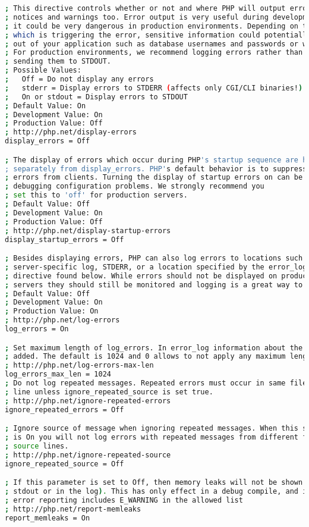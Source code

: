 \begin{lstlisting}[language=bash]
; This directive controls whether or not and where PHP will output errors,
; notices and warnings too. Error output is very useful during development, but
; it could be very dangerous in production environments. Depending on the code
; which is triggering the error, sensitive information could potentially leak
; out of your application such as database usernames and passwords or worse.
; For production environments, we recommend logging errors rather than
; sending them to STDOUT.
; Possible Values:
;   Off = Do not display any errors
;   stderr = Display errors to STDERR (affects only CGI/CLI binaries!)
;   On or stdout = Display errors to STDOUT
; Default Value: On
; Development Value: On
; Production Value: Off
; http://php.net/display-errors
display_errors = Off

; The display of errors which occur during PHP's startup sequence are handled
; separately from display_errors. PHP's default behavior is to suppress those
; errors from clients. Turning the display of startup errors on can be useful in
; debugging configuration problems. We strongly recommend you
; set this to 'off' for production servers.
; Default Value: Off
; Development Value: On
; Production Value: Off
; http://php.net/display-startup-errors
display_startup_errors = Off

; Besides displaying errors, PHP can also log errors to locations such as a
; server-specific log, STDERR, or a location specified by the error_log
; directive found below. While errors should not be displayed on productions
; servers they should still be monitored and logging is a great way to do that.
; Default Value: Off
; Development Value: On
; Production Value: On
; http://php.net/log-errors
log_errors = On

; Set maximum length of log_errors. In error_log information about the source is
; added. The default is 1024 and 0 allows to not apply any maximum length at all.
; http://php.net/log-errors-max-len
log_errors_max_len = 1024
; Do not log repeated messages. Repeated errors must occur in same file on same
; line unless ignore_repeated_source is set true.
; http://php.net/ignore-repeated-errors
ignore_repeated_errors = Off

; Ignore source of message when ignoring repeated messages. When this setting
; is On you will not log errors with repeated messages from different files or
; source lines.
; http://php.net/ignore-repeated-source
ignore_repeated_source = Off

; If this parameter is set to Off, then memory leaks will not be shown (on
; stdout or in the log). This has only effect in a debug compile, and if
; error reporting includes E_WARNING in the allowed list
; http://php.net/report-memleaks
report_memleaks = On


\end{lstlisting}
